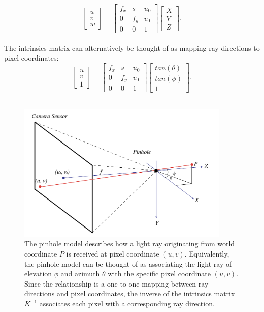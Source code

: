 \begin{equation}
\begin{bmatrix}
    u\\
    v\\
    w
\end{bmatrix} = 
\begin{bmatrix}
    f_x & s & u_0 \\ 
    0 & f_y  & v_0 \\ 
    0 & 0 & 1 
\end{bmatrix}
\begin{bmatrix}
    X \\
    Y \\
    Z
\end{bmatrix}.
\end{equation}\\
The intrinsics matrix can alternatively be thought of as mapping ray directions to pixel coordinates:\\
\begin{equation}
\begin{bmatrix}
    u\\
    v\\
    1
\end{bmatrix} = 
\begin{bmatrix}
    f_x & s & u_0 \\ 
    0 & f_y  & v_0 \\ 
    0 & 0 & 1 
\end{bmatrix}
\begin{bmatrix}
    tan(\theta) \\
    tan(\phi) \\
    1
\end{bmatrix}.
\end{equation}\\
\begin{figure}[htbp]
    \centering 
    \includegraphics[width=4in]{images/pinhole.png}
    \caption[The pinhole model of the camera]{The pinhole model describes how a light ray originating from world coordinate $P$ is received at pixel coordinate $(u, v)$. Equivalently, the pinhole model can be thought of as associating the light ray of elevation $\phi$ and azimuth $\theta$ with the specific pixel coordinate $(u, v)$. Since the relationship is a one-to-one mapping between ray directions and pixel coordinates, the inverse of the intrinsics matrix $K^{-1}$ associates each pixel with a corresponding ray direction.}
\end{figure}

